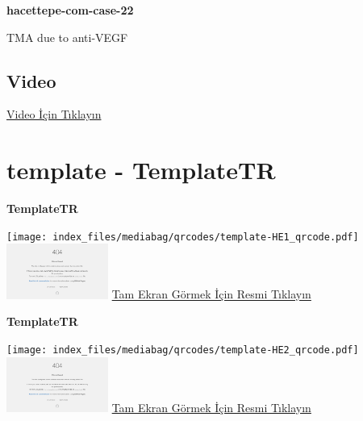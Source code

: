 \documentclass[
  letterpaper,
  DIV=11,
  numbers=noendperiod]{scrreprt}
\begin{document}
\textbf{hacettepe-com-case-22}

\begin{tcolorbox}[enhanced jigsaw, breakable, opacitybacktitle=0.6, arc=.35mm, colbacktitle=quarto-callout-tip-color!10!white, colback=white, toptitle=1mm, left=2mm, opacityback=0, colframe=quarto-callout-tip-color-frame, titlerule=0mm, rightrule=.15mm, bottomrule=.15mm, toprule=.15mm, bottomtitle=1mm, title=\textcolor{quarto-callout-tip-color}{\faLightbulb}\hspace{0.5em}{Tanı}, coltitle=black, leftrule=.75mm]

TMA due to anti-VEGF

\end{tcolorbox}

\hypertarget{video-21}{%
\subsection{Video}\label{video-21}}

\href{https://www.youtube.com/watch?v=wo6N0q5EiWc}{Video İçin Tıklayın}

\hypertarget{sec-template}{%
\section{template - TemplateTR}\label{sec-template}}

\textbf{TemplateTR}

\texttt{[image: index\_files/mediabag/qrcodes/template-HE1\_qrcode.pdf]}
\href{https://images.patolojiatlasi.com/template/HE1.html}{\includegraphics[width=0.25\textwidth,height=\textheight]{./screenshots/thumbnail_template-HE1.png}}
\href{https://images.patolojiatlasi.com/template/HE1.html}{Tam Ekran
Görmek İçin Resmi Tıklayın}

\textbf{TemplateTR}

\texttt{[image: index\_files/mediabag/qrcodes/template-HE2\_qrcode.pdf]}
\href{https://images.patolojiatlasi.com/template/HE2.html}{\includegraphics[width=0.25\textwidth,height=\textheight]{./screenshots/thumbnail_template-HE2.png}}
\href{https://images.patolojiatlasi.com/template/HE2.html}{Tam Ekran
Görmek İçin Resmi Tıklayın}
\end{document}

